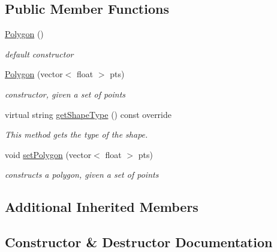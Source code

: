 \subsection*{Public Member Functions}
\begin{DoxyCompactItemize}
\item 
\hyperlink{classbridges_1_1datastructure_1_1_polygon_aed5756ee817adaadbff1b8e9702cbb42}{Polygon} ()
\begin{DoxyCompactList}\small\item\em default constructor \end{DoxyCompactList}\item 
\hyperlink{classbridges_1_1datastructure_1_1_polygon_a38759163e7b80c2e1582629354371ac5}{Polygon} (vector$<$ float $>$ pts)
\begin{DoxyCompactList}\small\item\em constructor, given a set of points \end{DoxyCompactList}\item 
virtual string \hyperlink{classbridges_1_1datastructure_1_1_polygon_a9e575d921e7883815f4505ebb13fffe4}{get\+Shape\+Type} () const override
\begin{DoxyCompactList}\small\item\em This method gets the type of the shape. \end{DoxyCompactList}\item 
void \hyperlink{classbridges_1_1datastructure_1_1_polygon_a058a8ec2340f15f45dab27b18978055c}{set\+Polygon} (vector$<$ float $>$ pts)
\begin{DoxyCompactList}\small\item\em constructs a polygon, given a set of points \end{DoxyCompactList}\end{DoxyCompactItemize}
\subsection*{Additional Inherited Members}


\subsection{Constructor \& Destructor Documentation}
\mbox{\label{classbridges_1_1datastructure_1_1_polygon_aed5756ee817adaadbff1b8e9702cbb42}} 
